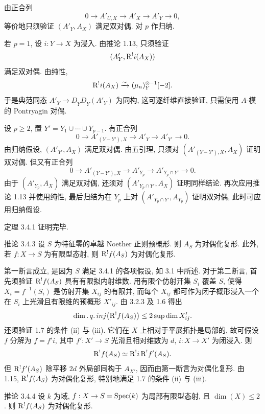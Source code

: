 \begin{prooftext}
由正合列
\[
   0\longrightarrow A'_{U,X}\longrightarrow A'_X\longrightarrow A'_Y\longrightarrow0,
\]
等价地只须验证 $(A'_Y,A_X)$ 满足双对偶. 对 $p$ 作归纳.

若 $p=1$, 设 $i:Y\to X$ 为浸入. 由推论 1.13, 只须验证
\[
   (A'_Y,\mathrm R^!i(A_X))
\]
满足双对偶. 由纯性,
\[
   \mathrm R^!i(A_X)\xrightarrow{\sim}(\mu_n)^{\otimes -1}_Y[-2].
\]
于是典范同态 $A'_Y\to\underline D_Y\underline D_Y(A'_Y)$ 为同构, 这可逐纤维直接验证, 只需使用 $A$-模的 Pontryagin 对偶.

设 $p\ge2$, 置 $Y'=Y_1\cup\cdots\cup Y_{p-1}$. 有正合列
\[
   0\longrightarrow A'_{(Y-Y'),X}\longrightarrow A'_Y\longrightarrow A'_{Y'}\longrightarrow0.
\]
由归纳假设, $(A'_{Y'},A_X)$ 满足双对偶. 由五引理, 只须对 $(A'_{(Y-Y'),X},A_X)$ 证明双对偶. 但又有正合列
\[
   0\longrightarrow A'_{(Y-Y'),X}\longrightarrow A'_{Y_p}\longrightarrow A'_{Y_p\cap Y'}\longrightarrow0.
\]
由于 $(A'_{Y_p},A_X)$ 满足双对偶, 还须对 $(A'_{Y_p\cap Y'},A_X)$ 证明同样结论. 再次应用推论 1.13 并使用纯性, 最后归结为在 $Y_p$ 上对 $(A'_{Y_p\cap Y'},A_{Y_p})$ 证明双对偶, 此时可应用归纳假设. \qedtext
\end{prooftext}

定理 3.4.1 证明完毕.

\begin{statement}{推论 3.4.3}
设 $S$ 为特征零的卓越 Noether 正则预概形. 则 $A_S$ 为对偶化复形. 此外, 若 $f:X\to S$ 为有限型态射, 则 $\mathrm R^!f(A_S)$ 为对偶化复形.
\end{statement}

\begin{prooftext}
第一断言成立, 是因为 $S$ 满足 3.4.1 的各项假设, 如 3.1 中所述. 对于第二断言, 首先须验证 $\mathrm R^!f(A_S)$ 具有有限拟内射维数. 用有限个仿射开集 $S_i$ 覆盖 $S$, 使得 $X_i=f^{-1}(S_i)$ 是仿射开集 $X_{ij}$ 的有限并, 而每个 $X_{ij}$ 都可作为闭子概形浸入一个在 $S_i$ 上光滑且有限维的预概形 $X'_{ij}$. 由 3.2.3 及 1.6 得出
\[
   \dim.\,q.\,inj\bigl(\mathrm R^!f(A_S)\bigr)
       \le 2\sup \dim X'_{ij}.
\]
还须验证 1.7 的条件 (ii) 与 (iii). 它们在 $X$ 上相对于平展拓扑是局部的, 故可假设 $f$ 分解为 $f=f'i$, 其中 $f':X'\to S$ 光滑且相对维数为 $d$, $i:X\to X'$ 为闭浸入. 则
\[
   \mathrm R^!f(A_S)\simeq \mathrm R^!i\,\mathrm R^!f'(A_S).
\]
但 $\mathrm R^!f'(A_S)$ 除平移 $2d$ 外局部同构于 $A_{X'}$, 因而由第一断言为对偶化复形. 由 1.15, $\mathrm R^!f(A_S)$ 为对偶化复形, 特别地满足 1.7 的条件 (ii) 与 (iii). \qedtext
\end{prooftext}

\begin{statement}{推论 3.4.4}
设 $k$ 为域, $f:X\to S=\operatorname{Spec}(k)$ 为局部有限型态射, 且 $\dim(X)\le2$. 则 $\mathrm R^!f(A_S)$ 为对偶化复形.
\end{statement}

